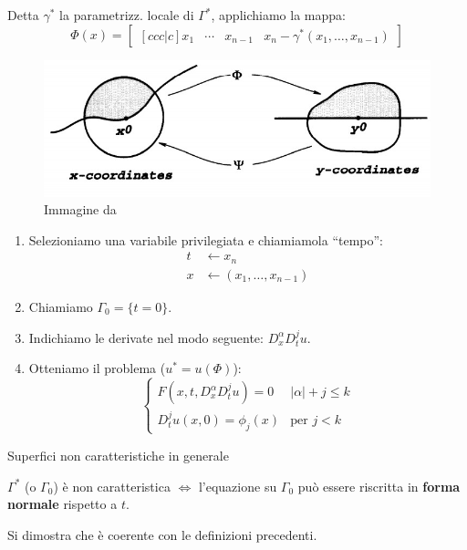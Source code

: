Detta $\gamma^*$ la parametrizz. locale di $\Gamma^*$, applichiamo la mappa:
$$\Phi (x) = 
\begin{bmatrix}[ccc|c]
x_1 & \cdots & x_{n-1} & x_n-\gamma^* (x_1,\ldots , x_{n-1})
\end{bmatrix}$$
\begin{figure}[H]
\centering
\includegraphics[scale=.5]{flatb}
\caption{Immagine da \cite[cap.8]{Evans}}
\end{figure}



\begin{enumerate}
\item Selezioniamo una variabile privilegiata e chiamiamola ``tempo'':
\begin{align*}
t & \leftarrow x_n \\
x & \leftarrow (x_1,\ldots , x_{n-1})
\end{align*}
\item Chiamiamo $\Gamma_0 = \{t=0\}$.
\item Indichiamo le derivate nel modo seguente: $D^\alpha_x D^j_t u$.
\item Otteniamo il problema ($u^*=u(\Phi)$):
\begin{equation*}
\begin{cases}
F(x,t, D^\alpha_x D^j_t u)=0 & |\alpha | +j \leq k\\
D^j_t u (x,0)= \phi_j(x) & \text{per }j<k 
\end{cases}
\end{equation*}
\end{enumerate}



Superfici non caratteristiche in generale

\begin{definition}
$\Gamma^*$ (o $\Gamma_0$) è non caratteristica $\iff$ l'equazione su $\Gamma_0$ può essere riscritta in \textbf{forma normale} rispetto a $t$.
\end{definition}

\begin{remark}
Si dimostra che è coerente con le definizioni precedenti.
\end{remark}

